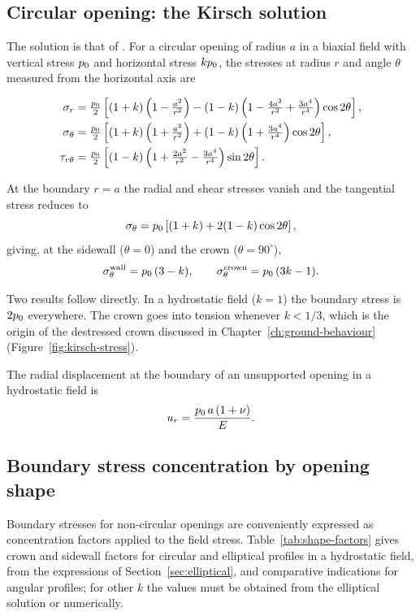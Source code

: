 \subsection{Circular opening: the Kirsch solution}
\label{sec:kirsch-appendix}

The solution is that of \citet{kirsch1898}.
For a circular opening of radius $a$ in a biaxial field with vertical stress
$p_0$ and horizontal stress $kp_0$, the stresses at radius $r$ and angle
$\theta$ measured from the horizontal axis are

\begin{align}
\sigma_r &= \tfrac{p_0}{2}\left[(1+k)\left(1-\tfrac{a^2}{r^2}\right)
   - (1-k)\left(1-\tfrac{4a^2}{r^2}+\tfrac{3a^4}{r^4}\right)\cos 2\theta\right],\\
\sigma_\theta &= \tfrac{p_0}{2}\left[(1+k)\left(1+\tfrac{a^2}{r^2}\right)
   + (1-k)\left(1+\tfrac{3a^4}{r^4}\right)\cos 2\theta\right],\\
\tau_{r\theta} &= \tfrac{p_0}{2}\left[(1-k)
   \left(1+\tfrac{2a^2}{r^2}-\tfrac{3a^4}{r^4}\right)\sin 2\theta\right].
\end{align}

At the boundary $r = a$ the radial and shear stresses vanish and the
tangential stress reduces to
\[
\sigma_\theta = p_0\left[(1+k) + 2(1-k)\cos 2\theta\right],
\]
giving, at the sidewall ($\theta = 0$) and the crown
($\theta = 90^\circ$),
\[
\sigma_\theta^{\text{wall}} = p_0\,(3-k), \qquad
\sigma_\theta^{\text{crown}} = p_0\,(3k-1).
\]

Two results follow directly. In a hydrostatic field ($k=1$) the boundary
stress is $2p_0$ everywhere. The crown goes into tension whenever
$k < 1/3$, which is the origin of the destressed crown discussed in
Chapter~\ref{ch:ground-behaviour} (Figure~\ref{fig:kirsch-stress}).

The radial displacement at the boundary of an unsupported opening in a
hydrostatic field is
\[
u_r = \frac{p_0\,a\,(1+\nu)}{E}.
\]

\subsection{Boundary stress concentration by opening shape}
\label{sec:shape-factors}

Boundary stresses for non-circular openings are conveniently expressed as
concentration factors applied to the field stress. Table~\ref{tab:shape-factors}
gives crown and sidewall factors for circular and elliptical profiles in a
hydrostatic field, from the expressions of Section~\ref{sec:elliptical}, and
comparative indications for angular profiles; for other $k$ the values must
be obtained from the elliptical solution or numerically.

